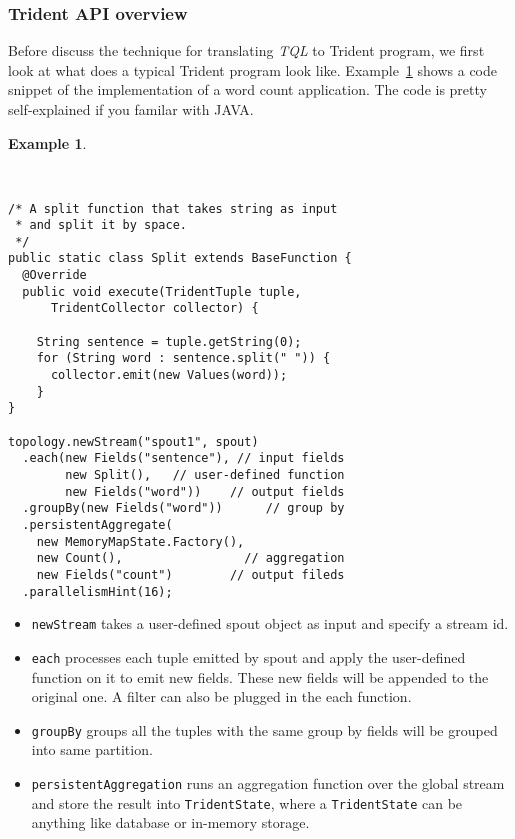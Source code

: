 \documentclass[conference, twocolumn, 11pt]{IEEEtran}
\theoremstyle{definition}
\newtheorem{example}{Example}[section]
\begin{document}
\subsubsection{Trident API overview}
Before discuss the technique for translating \emph{TQL} to Trident program, we first look at what does a typical Trident program look like. Example~\ref{trident-impl-exmp} shows a code snippet of the implementation of a word count application. The code is pretty self-explained if you familar with JAVA.
\begin{example}\label{trident-impl-exmp}
\footnotesize\begin{verbatim}


/* A split function that takes string as input
 * and split it by space.
 */
public static class Split extends BaseFunction {
  @Override
  public void execute(TridentTuple tuple, 
      TridentCollector collector) {
      
    String sentence = tuple.getString(0);
    for (String word : sentence.split(" ")) {
      collector.emit(new Values(word));
    }
}

topology.newStream("spout1", spout)
  .each(new Fields("sentence"), // input fields
        new Split(),   // user-defined function 
        new Fields("word"))    // output fields
  .groupBy(new Fields("word"))      // group by
  .persistentAggregate(
    new MemoryMapState.Factory(),
    new Count(),                 // aggregation
    new Fields("count")        // output fileds
  .parallelismHint(16);
\end{verbatim}
\normalsize
\end{example}

\begin{itemize}
\item \texttt{newStream} takes a user-defined spout object as input and specify a stream id.
\item \texttt{each} processes each tuple emitted by spout and apply the user-defined function on it to emit new fields. These new fields will be appended to the original one. A filter can also be plugged in the each function.
\item \texttt{groupBy} groups all the tuples with the same group by fields will be grouped into same partition. 
\item \texttt{persistentAggregation} runs an aggregation function over the global stream and store the result into \texttt{TridentState}, where a \texttt{TridentState} can be anything like database or in-memory storage.
\end{itemize}
\end{document}
